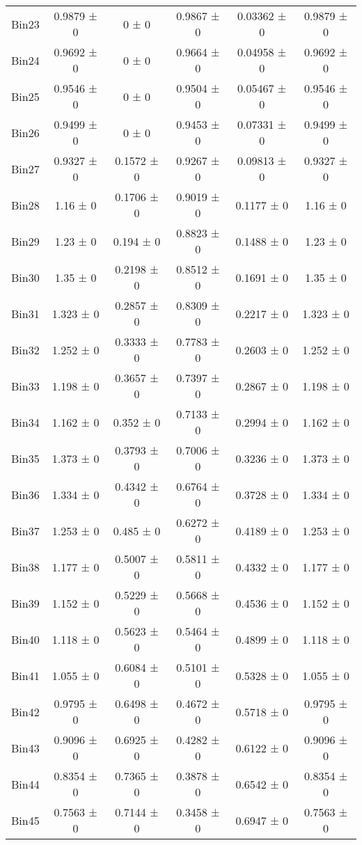 \begin{tabular}{@{\extracolsep{4pt}}lccccc@{}}
     Bin23 & 0.9879 ± 0 & 0 ± 0 & 0.9867 ± 0 & 0.03362 ± 0 & 0.9879 ± 0 \\ 
     Bin24 & 0.9692 ± 0 & 0 ± 0 & 0.9664 ± 0 & 0.04958 ± 0 & 0.9692 ± 0 \\ 
     Bin25 & 0.9546 ± 0 & 0 ± 0 & 0.9504 ± 0 & 0.05467 ± 0 & 0.9546 ± 0 \\ 
     Bin26 & 0.9499 ± 0 & 0 ± 0 & 0.9453 ± 0 & 0.07331 ± 0 & 0.9499 ± 0 \\ 
     Bin27 & 0.9327 ± 0 & 0.1572 ± 0 & 0.9267 ± 0 & 0.09813 ± 0 & 0.9327 ± 0 \\ 
     Bin28 & 1.16 ± 0 & 0.1706 ± 0 & 0.9019 ± 0 & 0.1177 ± 0 & 1.16 ± 0 \\ 
     Bin29 & 1.23 ± 0 & 0.194 ± 0 & 0.8823 ± 0 & 0.1488 ± 0 & 1.23 ± 0 \\ 
     Bin30 & 1.35 ± 0 & 0.2198 ± 0 & 0.8512 ± 0 & 0.1691 ± 0 & 1.35 ± 0 \\ 
     Bin31 & 1.323 ± 0 & 0.2857 ± 0 & 0.8309 ± 0 & 0.2217 ± 0 & 1.323 ± 0 \\ 
     Bin32 & 1.252 ± 0 & 0.3333 ± 0 & 0.7783 ± 0 & 0.2603 ± 0 & 1.252 ± 0 \\ 
     Bin33 & 1.198 ± 0 & 0.3657 ± 0 & 0.7397 ± 0 & 0.2867 ± 0 & 1.198 ± 0 \\ 
     Bin34 & 1.162 ± 0 & 0.352 ± 0 & 0.7133 ± 0 & 0.2994 ± 0 & 1.162 ± 0 \\ 
     Bin35 & 1.373 ± 0 & 0.3793 ± 0 & 0.7006 ± 0 & 0.3236 ± 0 & 1.373 ± 0 \\ 
     Bin36 & 1.334 ± 0 & 0.4342 ± 0 & 0.6764 ± 0 & 0.3728 ± 0 & 1.334 ± 0 \\ 
     Bin37 & 1.253 ± 0 & 0.485 ± 0 & 0.6272 ± 0 & 0.4189 ± 0 & 1.253 ± 0 \\ 
     Bin38 & 1.177 ± 0 & 0.5007 ± 0 & 0.5811 ± 0 & 0.4332 ± 0 & 1.177 ± 0 \\ 
     Bin39 & 1.152 ± 0 & 0.5229 ± 0 & 0.5668 ± 0 & 0.4536 ± 0 & 1.152 ± 0 \\ 
     Bin40 & 1.118 ± 0 & 0.5623 ± 0 & 0.5464 ± 0 & 0.4899 ± 0 & 1.118 ± 0 \\ 
     Bin41 & 1.055 ± 0 & 0.6084 ± 0 & 0.5101 ± 0 & 0.5328 ± 0 & 1.055 ± 0 \\ 
     Bin42 & 0.9795 ± 0 & 0.6498 ± 0 & 0.4672 ± 0 & 0.5718 ± 0 & 0.9795 ± 0 \\ 
     Bin43 & 0.9096 ± 0 & 0.6925 ± 0 & 0.4282 ± 0 & 0.6122 ± 0 & 0.9096 ± 0 \\ 
     Bin44 & 0.8354 ± 0 & 0.7365 ± 0 & 0.3878 ± 0 & 0.6542 ± 0 & 0.8354 ± 0 \\ 
     Bin45 & 0.7563 ± 0 & 0.7144 ± 0 & 0.3458 ± 0 & 0.6947 ± 0 & 0.7563 ± 0 \\ 

\end{tabular}
